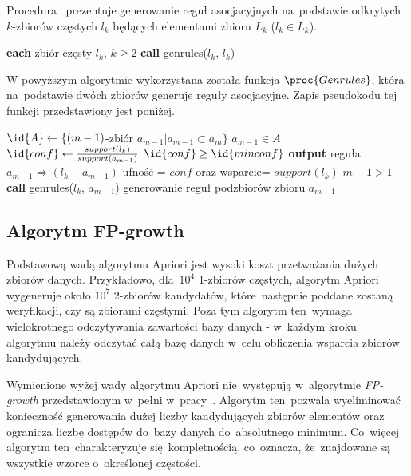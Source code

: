 Procedura~ prezentuje generowanie reguł asocjacyjnych na~podstawie odkrytych $k$-zbiorów częstych $l_k$ będących elementami zbioru $L_k$ ($l_k \in L_k$).

\begin{codebox}
		\li \For \textbf{each} zbiór częsty $l_k$, $k \geq 2$ 
		\li \Do
			\textbf{call} genrules($l_k$, $l_k$)
			\End
		\End
\end{codebox}

W powyższym algorytmie wykorzystana została funkcja $\proc{Genrules}$, która na~podstawie dwóch zbiorów generuje reguły asocjacyjne. Zapis pseudokodu tej funkcji przedstawiony jest poniżej.

\begin{codebox}
		\li $\id{A} \gets \lbrace (m-1)$-zbiór $a_{m-1} | a_{m-1} \subset a_m \rbrace$
		\li \For $a_{m-1} \in A$
			\li \Do
			$\id{conf} \gets \frac{support(l_k)}{support(a_{m-1})}$
			\li \If $\id{conf} \geq \id{minconf}$
				\li \Then
						\textbf{output} reguła $a_{m-1} \Rightarrow (l_k - a_{m-1})$ \CommentSymbol ufność = $conf$ oraz wsparcie= $support(l_k)$
						\li \If $m-1 > 1$ 
							\li \Then
							\textbf{call} genrules($l_k$, $a_{m-1}$) \CommentSymbol generowanie reguł podzbiorów zbioru $a_{m-1}$
						\End
				\End
			\End
		\End
\end{codebox}

\subsection{Algorytm FP-growth\label{sec:fpgrowth}}

Podstawową wadą algorytmu Apriori jest wysoki koszt przetważania dużych zbiorów danych. Przykładowo, dla~$10^4$ 1-zbiorów częstych, algorytm Apriori wygeneruje około $10^7$ 2-zbiorów kandydatów, które~następnie poddane zostaną weryfikacji, czy są zbiorami częstymi. Poza tym algorytm ten~wymaga wielokrotnego odczytywania zawartości bazy danych - w~każdym kroku algorytmu należy odczytać całą bazę danych w~celu obliczenia wsparcia zbiorów kandydujących.

Wymienione wyżej wady algorytmu Apriori nie~występują w~algorytmie \emph{FP-growth} przedstawionym w~pełni w~pracy~\cite{Main:FPgrowth}. Algorytm ten~pozwala wyeliminować konieczność generowania dużej liczby kandydujących zbiorów elementów oraz ogranicza liczbę dostępów do~bazy danych do~absolutnego minimum. Co~więcej algorytm ten~charakteryzuje się~kompletnością, co~oznacza, że~znajdowane są wszystkie wzorce o~określonej częstości.

